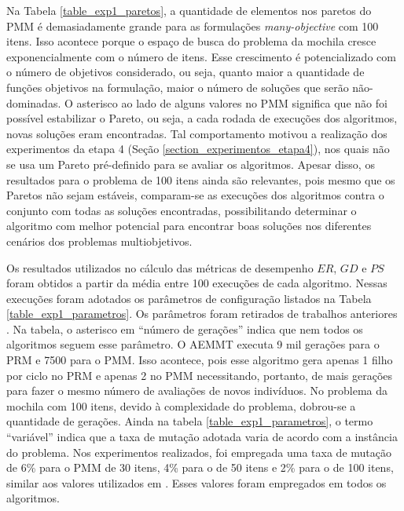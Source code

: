 Na Tabela \ref{table_exp1_paretos}, a quantidade de elementos nos paretos do PMM é demasiadamente grande para as formulações \textit{many-objective} com 100 itens. Isso acontece porque o espaço de busca do problema da mochila cresce exponencialmente com o número de itens. Esse crescimento é potencializado com o número de objetivos considerado, ou seja, quanto maior a quantidade de funções objetivos na formulação, maior o número de soluções que serão não-dominadas. O asterisco ao lado de alguns valores no PMM significa que não foi possível estabilizar o Pareto, ou seja, a cada rodada de execuções dos algoritmos, novas soluções eram encontradas. Tal comportamento motivou a realização dos experimentos da etapa 4 (Seção \ref{section_experimentos_etapa4}), nos quais não se usa um Pareto pré-definido para se avaliar os algoritmos. Apesar disso, os resultados para o problema de 100 itens ainda são relevantes, pois mesmo que os Paretos não sejam estáveis, comparam-se as execuções dos algoritmos contra o conjunto com todas as soluções encontradas, possibilitando determinar o algoritmo com melhor potencial para encontrar boas soluções nos diferentes cenários dos problemas multiobjetivos.

Os resultados utilizados no cálculo das métricas de desempenho $ER$, $GD$ e $PS$ foram obtidos a partir da média entre 100 execuções de cada algoritmo. Nessas execuções foram adotados os parâmetros de configuração listados na Tabela \ref{table_exp1_parametros}. Os parâmetros foram retirados de trabalhos anteriores \cite{LafetaThesis, Brasil2013, Ishibuchi2015}. Na tabela, o asterisco em ``número de gerações'' indica que nem todos os algoritmos seguem esse parâmetro. O AEMMT executa 9 mil gerações para o PRM e 7500 para o PMM. Isso acontece, pois esse algoritmo gera apenas 1 filho por ciclo no PRM e apenas 2 no PMM necessitando, portanto, de mais gerações para fazer o mesmo número de avaliações de novos indivíduos. No problema da mochila com 100 itens, devido à complexidade do problema, dobrou-se a quantidade de gerações. Ainda na tabela \ref{table_exp1_parametros}, o termo ``variável'' indica que a taxa de mutação adotada varia de acordo com a instância do problema. Nos experimentos realizados, foi empregada uma taxa de mutação de 6\% para o PMM de 30 itens, 4\% para o de 50 itens e 2\% para o de 100 itens, similar aos valores utilizados em \cite{Ishibuchi2015}. Esses valores foram empregados em todos os algoritmos.

